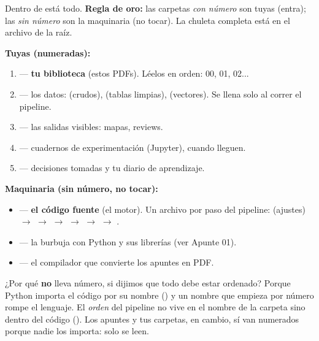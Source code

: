 \documentclass[11pt,a4paper]{article}
\begin{document}
Dentro de  está todo.
\textbf{Regla de oro:} las carpetas \emph{con número} son tuyas (entra); las \emph{sin
número} son la maquinaria (no tocar). La chuleta completa está en el archivo
 de la raíz.

\textbf{Tuyas (numeradas):}
\begin{enumerate}
  \item {} --- \textbf{tu biblioteca} (estos PDFs). Léelos en orden: 00, 01, 02...
  \item {} --- los datos:  (crudos),  (tablas
        limpias),  (vectores). Se llena solo al correr el pipeline.
  \item {} --- las salidas visibles: mapas, reviews.
  \item {} --- cuadernos de experimentación (Jupyter), cuando lleguen.
  \item {} --- decisiones tomadas y tu diario de aprendizaje.
\end{enumerate}

\textbf{Maquinaria (sin número, no tocar):}
\begin{itemize}
  \item {} --- \textbf{el código fuente} (el motor). Un archivo por paso del
        pipeline:  (ajustes) $\rightarrow$  $\rightarrow$
         $\rightarrow$  $\rightarrow$ 
        $\rightarrow$  $\rightarrow$ .
  \item {} --- la burbuja con Python y sus librerías (ver Apunte 01).
  \item {} --- el compilador que convierte los apuntes en PDF.
\end{itemize}

\begin{ojo}
¿Por qué  \textbf{no} lleva número, si dijimos que todo debe estar ordenado?
Porque Python importa el código por su nombre () y un nombre
que empieza por número rompe el lenguaje. El \emph{orden} del pipeline no vive en el nombre
de la carpeta sino dentro del código (). Los apuntes y tus
carpetas, en cambio, sí van numerados porque nadie los importa: solo se leen.
\end{ojo}
\end{document}
